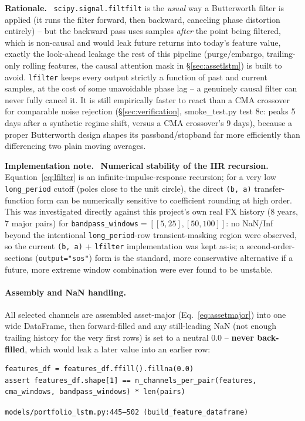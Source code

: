 \documentclass[11pt]{article}
\newcommand{\srcref}[1]{\hfill\textcolor{cmtcolor}{\footnotesize\texttt{#1}}}
\newcommand{\rationalelabel}{\small\textbf{Rationale.}~}
\newcommand{\fixnotelabel}{\small\textbf{Implementation note.}~}
\begin{document}
\begin{rationale}\rationalelabel
\texttt{scipy.signal.filtfilt} is the \emph{usual} way a Butterworth filter is applied (it
runs the filter forward, then backward, canceling phase distortion entirely) -- but the
backward pass uses samples \emph{after} the point being filtered, which is non-causal and
would leak future returns into today's feature value, exactly the look-ahead leakage the
rest of this pipeline (purge/embargo, trailing-only rolling features, the causal attention
mask in \S\ref{sec:assetlstm}) is built to avoid. \texttt{lfilter} keeps every output
strictly a function of past and current samples, at the cost of some unavoidable phase lag
-- a genuinely causal filter can never fully cancel it. It is still empirically faster to
react than a CMA crossover for comparable noise rejection (\S\ref{sec:verification},
smoke\_test.py test 8c: peaks 5 days after a synthetic regime shift, versus a CMA
crossover's 9 days), because a proper Butterworth design shapes its passband/stopband far
more efficiently than differencing two plain moving averages.
\end{rationale}

\begin{fixnote}\fixnotelabel
\textbf{Numerical stability of the IIR recursion.} Equation~\ref{eq:lfilter} is an
infinite-impulse-response recursion; for a very low \texttt{long\_period} cutoff (poles
close to the unit circle), the direct \texttt{(b, a)} transfer-function form can be
numerically sensitive to coefficient rounding at high order. This was investigated directly
against this project's own real FX history (8 years, 7 major pairs) for
\texttt{bandpass\_windows}$=[[5,25],[50,100]]$: no NaN/Inf beyond the intentional
\texttt{long\_period}-row transient-masking region were observed, so the current
\texttt{(b, a)} + \texttt{lfilter} implementation was kept as-is; a second-order-sections
(\texttt{output="sos"}) form is the standard, more conservative alternative if a future,
more extreme window combination were ever found to be unstable.
\end{fixnote}

\paragraph{Assembly and NaN handling.} All selected channels are assembled asset-major
(Eq.~\ref{eq:assetmajor}) into one wide DataFrame, then forward-filled and any still-leading
NaN (not enough trailing history for the very first rows) is set to a neutral $0.0$ --
\textbf{never back-filled}, which would leak a later value into an earlier row:
\begin{lstlisting}[caption={Feature assembly - one function builds every selected channel.}, label=lst:buildfeat]
features_df = features_df.ffill().fillna(0.0)
assert features_df.shape[1] == n_channels_per_pair(features, cma_windows, bandpass_windows) * len(pairs)
\end{lstlisting}
\srcref{models/portfolio\_lstm.py:445--502 (\texttt{build\_feature\_dataframe})}
\end{document}
